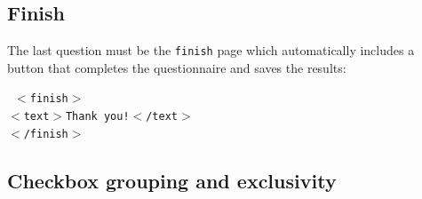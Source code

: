 \documentclass[11pt,a4paper,titlepage]{article}
\begin{document}
\subsection{Finish}

The last question must be the \texttt{finish} page which automatically includes a button that completes the questionnaire and saves the results:
%
\begin{center}
\begin{tcolorbox}[colback=black!10!white,colframe=black!50!white]
\texttt{
$<$finish$>$\\
\hspace*{0.5cm}$<$text$>$Thank you!$<$/text$>$\\
$<$/finish$>$}
\end{tcolorbox}
\end{center}

\subsection{Checkbox grouping and exclusivity}
\end{document}
